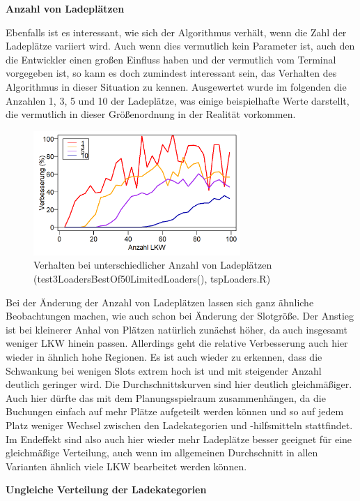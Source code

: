 \textbf{Anzahl von Ladeplätzen}

Ebenfalls ist es interessant, wie sich der Algorithmus verhält, wenn die Zahl der Ladeplätze variiert wird. Auch wenn dies vermutlich kein Parameter ist, auch den die Entwickler einen großen Einfluss haben und der vermutlich vom Terminal vorgegeben ist, so kann es doch zumindest interessant sein, das Verhalten des Algorithmus in dieser Situation zu kennen. Ausgewertet wurde im folgenden die Anzahlen 1, 3, 5 und 10 der Ladeplätze, was einige beispielhafte Werte darstellt, die vermutlich in dieser Größenordnung in der Realität vorkommen.

\begin{figure}[H]
    \centering
    \includegraphics[width=0.7\textwidth]{images/graphs/tspSimALimLoaders.png}
    \caption{Verhalten bei unterschiedlicher Anzahl von Ladeplätzen (test3LoadersBestOf50LimitedLoaders(), tspLoaders.R)}
    \label{fig:tspEvalLoaders}
\end{figure}

Bei der Änderung der Anzahl von Ladeplätzen lassen sich ganz ähnliche Beobachtungen machen, wie auch schon bei Änderung der Slotgröße. Der Anstieg ist bei kleinerer Anhal von Plätzen natürlich zunächst höher, da auch insgesamt weniger LKW hinein passen. Allerdings geht die relative Verbesserung auch hier wieder in ähnlich hohe Regionen. Es ist auch wieder zu erkennen, dass die Schwankung bei wenigen Slots extrem hoch ist und mit steigender Anzahl deutlich geringer wird. Die Durchschnittskurven sind hier deutlich gleichmäßiger. Auch hier dürfte das mit dem Planungsspielraum zusammenhängen, da die Buchungen einfach auf mehr Plätze aufgeteilt werden können und so auf jedem Platz weniger Wechsel zwischen den Ladekategorien und -hilfsmitteln stattfindet. Im Endeffekt sind also auch hier wieder mehr Ladeplätze besser geeignet für eine gleichmäßige Verteilung, auch wenn im allgemeinen Durchschnitt in allen Varianten ähnlich viele LKW bearbeitet werden können.


\textbf{Ungleiche Verteilung der Ladekategorien}



